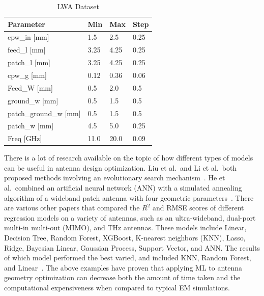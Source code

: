 \documentclass[conference]{IEEEtran}
\begin{document}
\begin{table}[h]
\caption{LWA Dataset}
\begin{center}
\begin{tabular}{ |l|l|l|l| }
    \hline
    Parameter & Min & Max & Step \\ 
    \hline
    cpw\_in [mm] & 1.5 & 2.5 & 0.25 \\
    \hline
    feed\_l [mm] & 3.25 & 4.25 & 0.25 \\
    \hline
    patch\_l [mm] & 3.25 & 4.25 & 0.25 \\
    \hline
    cpw\_g [mm] & 0.12 & 0.36 & 0.06 \\
    \hline
    Feed\_W [mm] & 0.5 & 2.0 & 0.5 \\
    \hline
    ground\_w [mm] & 0.5 & 1.5 & 0.5 \\
    \hline
    patch\_ground\_w [mm] & 0.5 & 1.5 & 0.5 \\
    \hline
    patch\_w [mm] & 4.5 & 5.0 & 0.25 \\
    \hline
    Freq [GHz] & 11.0 & 20.0 & 0.09 \\
    \hline
\end{tabular}
\end{center}
\label{antenna_design_lw}
\end{table}

There is a lot of research available on the topic of how different types of models can be useful in antenna design optimization. Liu et al.~and Li et al.~both proposed methods involving an evolutionary search mechanism~\cite{liu_efficient_2014,li_adaptive_2023}. He et al.~combined an artificial neural network (ANN) with a simulated annealing algorithm of a wideband patch antenna with four geometric parameters~\cite{10318051}. There are various other papers that compared the $R^2$ and RMSE scores of different regression models on a variety of antennas, such as an ultra-wideband, dual-port multi-in multi-out (MIMO), and THz antennas. These models include Linear, Decision Tree, Random Forest, XGBoost, K-nearest neighbors (KNN), Lasso, Ridge, Bayesian Linear, Gaussian Process, Support Vector, and ANN. The results of which model performed the best varied, and included KNN, Random Forest, and Linear~\cite{9119820,ranjan_ultra-wideband_2022,ranjan_design_2023,sharma_machine_2020,jain_estimation_2022,jain_design_2024,haque_machine_2023,m_el-kenawy_optimized_2022}. The above examples have proven that applying ML to antenna geometry optimization can decrease both the amount of time taken and the computational expensiveness when compared to typical EM simulations.
\end{document}
